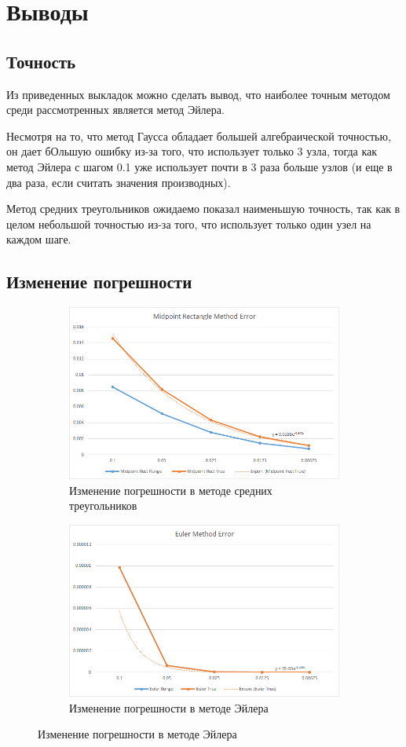 \documentclass[11pt,a4paper,oneside]{article}
\begin{document}
\section{Выводы}

\subsection{Точность}

Из приведенных выкладок можно сделать вывод, что наиболее точным методом среди рассмотренных является метод Эйлера.

Несмотря на то, что метод Гаусса обладает большей алгебраической точностью, он дает бОльшую ошибку из-за того, что использует только 3 узла, тогда как метод Эйлера с шагом 0.1 уже использует почти в 3 раза больше узлов (и еще в два раза, если считать значения производных).

Метод средних треугольников ожидаемо показал наименьшую точность, так как в целом небольшой точностью из-за того, что использует только один узел на каждом шаге.

\subsection{Изменение погрешности}

\begin{figure}
	\begin{subfigure}{\textwidth}
		\centering
		\includegraphics[width=0.8\linewidth]{pics/midpoint_errors.png}
		\caption{Изменение погрешности в методе средних треугольников}
	\end{subfigure}
	\begin{subfigure}{\textwidth}
		\centering
		\includegraphics[width=0.8\linewidth]{pics/euler_errors.png}
		\caption{Изменение погрешности в методе Эйлера}
	\end{subfigure}
\end{figure}
\end{document}

